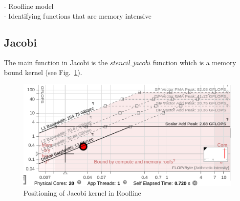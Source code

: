 
-	Roofline model \\
-	Identifying functions that are memory intensive \\

\subsection{Jacobi}
The main function in Jacobi is the $stencil\_jacobi$ function which is a memory bound kernel (see Fig.~\ref{fig:roof-jacobi}). 

\begin{figure}[h]%
\begin{center}
\includegraphics[width=1\linewidth]{MEMSYS22/figures/roofline/jacobi.png}
\end{center}
  \vspace{-0.1in}
\caption{Positioning of Jacobi kernel in Roofline}
\label{fig:roof-jacobi}
\vspace{-0.2in}
\end{figure}

%
%
%
%
%  
%
%
%


